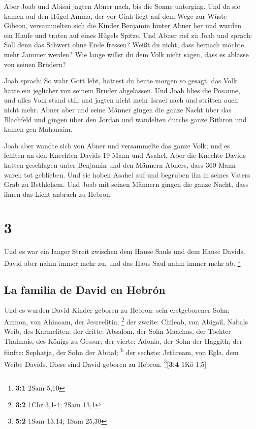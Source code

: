  Aber Joab und Abisai jagten Abner nach, bis die Sonne
unterging. Und da sie kamen auf den Hügel Amma, der vor Giah liegt auf
dem Wege zur Wüste Gibeon,  versammelten sich die Kinder
Benjamin hinter Abner her und wurden ein Haufe und traten auf eines
Hügels Spitze.  Und Abner rief zu Joab und sprach: Soll
denn das Schwert ohne Ende fressen? Weißt du nicht, dass hernach möchte
mehr Jammer werden? Wie lange willst du dem Volk nicht sagen, dass es
ablasse von seinen Brüdern?

 Joab sprach: So wahr Gott lebt, hättest du heute morgen
so gesagt, das Volk hätte ein jeglicher von seinem Bruder abgelassen.
 Und Joab blies die Posaune, und alles Volk stand still
und jagten nicht mehr Israel nach und stritten auch nicht mehr.
 Abner aber und seine Männer gingen die ganze Nacht über
das Blachfeld und gingen über den Jordan und wandelten durchs ganze
Bithron und kamen gen Mahanaim.

 Joab aber wandte sich von Abner und versammelte das
ganze Volk; und es fehlten an den Knechten Davids 19 Mann und Asahel.
 Aber die Knechte Davids hatten geschlagen unter Benjamin
und den Männern Abners, dass 360 Mann waren tot geblieben.
 Und sie hoben Asahel auf und begruben ihn in seines
Vaters Grab zu Bethlehem. Und Joab mit seinen Männern gingen die ganze
Nacht, dass ihnen das Licht anbrach zu Hebron.

\hypertarget{section-2}{%
\section{3}\label{section-2}}

 Und es war ein langer Streit zwischen dem Hause Sauls und
dem Hause Davids. David aber nahm immer mehr zu, und das Haus Saul nahm
immer mehr ab. \footnote{\textbf{3:1} 2Sam 5,10}

\hypertarget{la-familia-de-david-en-hebruxf3n}{%
\subsection{La familia de David en
Hebrón}\label{la-familia-de-david-en-hebruxf3n}}

 Und es wurden David Kinder geboren zu Hebron: sein
erstgeborener Sohn: Amnon, von Ahinoam, der Jesreelitin; \footnote{\textbf{3:2}
  1Chr 3,1-4; 2Sam 13,1}  der zweite: Chileab, von
Abigail, Nabals Weib, des Karmeliten; der dritte: Absalom, der Sohn
Maachas, der Tochter Thalmais, des Königs zu Gessur;  der
vierte: Adonia, der Sohn der Haggith; der fünfte: Sephatja, der Sohn der
Abital; \textsuperscript{b}  der sechste: Jethream, von
Egla, dem Weibe Davids. Diese sind David geboren zu Hebron.
\footnote{\textbf{5:2} 1Sam 13,14; 1Sam 25,30}{[}\textbf{3:4} 1Kö 1,5{]}

